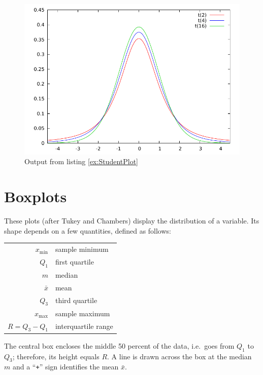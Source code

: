 \begin{figure}[htbp]
  \centering
  \includegraphics{figures/StudentPlot}
  \caption{Output from listing \ref{ex:StudentPlot}}
  \label{fig:StudentPlot}
\end{figure}


\pagebreak[4]

\section{Boxplots}
\label{sect-boxplots}

These plots (after Tukey and Chambers) display the distribution of a
variable. Its shape depends on a few quantities, defined as follows:

\begin{center}
\begin{tabular}{rl}
  $x_{\mathrm{min}}$ & sample minimum \\
  $Q_1$ & first quartile \\
  $m$ & median \\
  $\bar{x}$ & mean \\
  $Q_3$ & third quartile \\
  $x_{\mathrm{max}}$ & sample maximum\\
  $R = Q_3 - Q_1$ & interquartile range\\
\end{tabular}
\end{center}

The central box encloses the middle 50 percent of the data, i.e.\ goes
from $Q_1$ to $Q_3$; therefore, its height equals $R$.  A line
is drawn across the box at the median $m$ and a ``\texttt{+}'' sign
identifies the mean $\bar{x}$.

